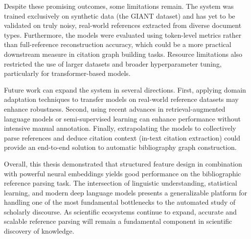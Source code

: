 Despite these promising outcomes, some limitations remain. The system was trained exclusively on synthetic data (the GIANT dataset) and has yet to be validated on truly noisy, real-world references extracted from diverse document types. Furthermore, the models were evaluated using token-level metrics rather than full-reference reconstruction accuracy, which could be a more practical downstream measure in citation graph building tasks. Resource limitations also restricted the use of larger datasets and broader hyperparameter tuning, particularly for transformer-based models.

Future work can expand the system in several directions. First, applying domain adaptation techniques to transfer models on real-world reference datasets may enhance robustness. Second, using recent advances in retrieval-augmented language models or semi-supervised learning can enhance performance without intensive manual annotation. Finally, extrapolating the models to collectively parse references and deduce citation context (in-text citation extraction) could provide an end-to-end solution to automatic bibliography graph construction.

Overall, this thesis demonstrated that structured feature design in combination with powerful neural embeddings yields good performance on the bibliographic reference parsing task. The intersection of linguistic understanding, statistical learning, and modern deep language models presents a generalizable platform for handling one of the most fundamental bottlenecks to the automated study of scholarly discourse. As scientific ecosystems continue to expand, accurate and scalable reference parsing will remain a fundamental component in scientific discovery of knowledge.
